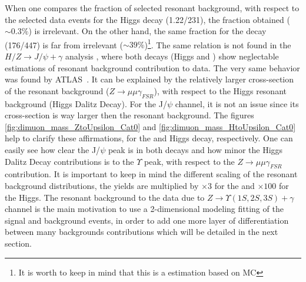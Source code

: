 When one compares the fraction of selected resonant background, with respect to the selected data events for the Higgs decay (1.22/231), the fraction obtained ($\sim0.3\%$) is irrelevant. On the other hand, the same fraction for the \Z decay (176/447) is far from irrelevant ($\sim39\%$)\footnote{It is worth to keep in mind that this is a estimation based on MC}. The same relation is not found in the $H/Z \rightarrow J/\psi + \gamma$ analysis \cite{papper_jpsi}, where both decays (Higgs and \Z) show neglectable estimations of resonant background contribution to data. 
The very same behavior was found by ATLAS~\cite{atlas_paper:PhysRevLett.114.121801}. It can be explained by the relatively larger cross-section of the \Z resonant background ($Z \rightarrow \mu\mu\gamma_{FSR}$), with respect to the Higgs resonant background (Higgs Dalitz Decay). For the J/$\psi$ channel, it is not an issue since its  cross-section is way larger then the resonant background. The figures \ref{fig:dimuon_mass_ZtoUpsilon_Cat0} and \ref{fig:dimuon_mass_HtoUpsilon_Cat0} help to clarify these affirmations, for the \Z and Higgs decay, respectively. 
One can easily see how clear the J/$\psi$ peak is in both decays and how minor the Higgs Dalitz Decay contributions is to the $\Upsilon$ peak, with respect to the $Z \rightarrow \mu\mu\gamma_{FSR}$ contribution. It is important to keep in mind the different scaling of the resonant background distributions, the yields are multiplied by $\times 3$ for the \Z and $\times 100$ for the Higgs.
The resonant background to the data due to $Z \rightarrow \Upsilon(1S,2S,3S) + \gamma$ channel  is the main motivation to use a 2-dimensional modeling fitting of the signal and background events, in order to add one more layer of differentiation between many backgrounds contributions which will be detailed in the next section.

